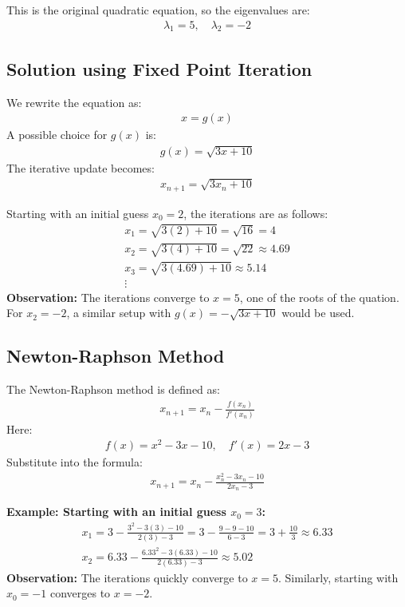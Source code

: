 \documentclass[journal]{IEEEtran}
\begin{document}
This is the original quadratic equation, so the eigenvalues are:
\begin{align}
    \lambda_1 = 5, \quad \lambda_2 = -2
\end{align}

\subsection*{ Solution using Fixed Point Iteration}
We rewrite the equation as:
\begin{align}
    x = g(x)
\end{align}
A possible choice for \( g(x) \) is:
\begin{align}
    g(x) = \sqrt{3x + 10}
\end{align}
The iterative update becomes:
\begin{align}
    x_{n+1} = \sqrt{3x_n + 10}
\end{align}

Starting with an initial guess \( x_0 = 2 \), the iterations are as follows:
\begin{align}
    x_1 = \sqrt{3(2) + 10} = \sqrt{16} = 4 \\
    x_2 = \sqrt{3(4) + 10} = \sqrt{22} \approx 4.69 \\
    x_3 = \sqrt{3(4.69) + 10} \approx 5.14 \\
    \vdots
\end{align}
\textbf{Observation:} The iterations converge to \( x = 5 \), one of the roots of the quation. For \( x_2 = -2 \), a similar setup with \( g(x) = -\sqrt{3x + 10} \) would be used.

\subsection*{ Newton-Raphson Method}
The Newton-Raphson method is defined as:
\begin{align}
    x_{n+1} = x_n - \frac{f(x_n)}{f'(x_n)}
\end{align}
Here:
\begin{align}
    f(x) = x^2 - 3x - 10, \quad f'(x) = 2x - 3
\end{align}
Substitute into the formula:
\begin{align}
    x_{n+1} = x_n - \frac{x_n^2 - 3x_n - 10}{2x_n - 3}
\end{align}

\textbf{Example: Starting with an initial guess \( x_0 = 3 \):}
\begin{align}
    x_1 = 3 - \frac{3^2 - 3(3) - 10}{2(3) - 3} = 3 - \frac{9 - 9 - 10}{6 - 3} = 3 + \frac{10}{3} \approx 6.33 \\
    x_2 = 6.33 - \frac{6.33^2 - 3(6.33) - 10}{2(6.33) - 3} \approx 5.02
\end{align}
\textbf{Observation:} The iterations quickly converge to \( x = 5 \). Similarly, starting with \( x_0 = -1 \) converges to \( x = -2 \).
\end{document}
